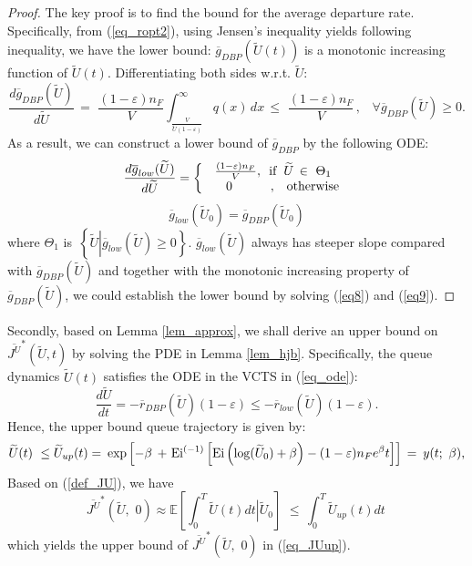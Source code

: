 \documentclass[11pt,journal, onecolumn]{./IEEEtran}
\newcommand{\red}{\color{black}}
\begin{document}
\begin{proof} {\red The key proof is to find the bound for the average departure rate. Specifically,
from (\ref{eq_ropt2}), using Jensen's inequality yields following inequality, we have the lower bound:}
$\overline g _{DBP}(\widetilde U(t))$ is a monotonic increasing function of $\widetilde U(t)$. Differentiating both sides w.r.t. $\widetilde U$:
\[\frac{{d{{\overline g }_{DBP}}(\widetilde U)}}{{d\widetilde U}}\, = \,\,\frac{(1 - {\varepsilon}){n_F}}{V}\int_{\frac{V}{{{\widetilde U}(1 - {\varepsilon})}}}^\infty  {q(x)} \,dx\, \le \,\,\frac{(1 - {\varepsilon}){n_F}}{V}\,,\,\,\,\,\,\forall {\overline g _{DBP}}(\widetilde U) \ge 0.\]
As a result, we can construct a lower bound of $\overline g_{DBP}$ by the following ODE:
\begin{equation}\label{eq8}\frac{{d{{\overline g }_{low}}(\widetilde U)}}{{d\widetilde U}} = \left\{ {\begin{array}{*{20}{c}}
   {\frac{ (1 - {\varepsilon}){n_F}}{V},\,\,\,{\rm{if}}\,\,\,\widetilde U\, \in \,\,{\Theta _1}\,}  \\
   {\,\,\,\,\,\,\,\,0\,\,\,\,\,\,\,\,\,\,\,\,\,\,\,\,\,\,,\,\,\,\,\,{\rm{otherwise}}}  \\
\end{array}\,} \right.
\end{equation}
\begin{equation}\label{eq9}{\overline g_{low}}({\widetilde U_0}) = {\overline g_{DBP}}({\widetilde U_0})\end{equation}
where $\Theta_1$ is $\,\left\{ {\widetilde U\left| {{{\overline g _{low}}}(\widetilde U) \ge 0} \right.} \right\}$. ${\overline g _{low}}(\widetilde U)$ always has steeper slope compared with $\overline g_{DBP}(\widetilde U)$ and together with the monotonic increasing property of $\overline g _{DBP}(\widetilde U)$, we could establish the lower bound by solving (\ref{eq8}) and (\ref{eq9}).
\end{proof}


{\red Secondly, based on Lemma \ref{lem_approx}, we shall derive an upper bound on $\overline {J^U}^*(\widetilde U,t)$ by solving the PDE in Lemma \ref{lem_hjb}.} Specifically, the queue dynamics $\widetilde U(t)$ satisfies the ODE in the VCTS in (\ref{eq_ode}):
\begin{equation}\label{eq_odeapx}
\frac{d\widetilde U}{dt} = -\overline{r}_{DBP}(\widetilde U)(1-\varepsilon) \leq -\overline{r}_{low}(\widetilde U)(1-\varepsilon).
\end{equation}
Hence, the upper bound queue trajectory is given by:
\begin{equation}\label{eq_uup}
\widetilde U(t)\,\, \le {\widetilde U_{up}}(t) = {\mkern 1mu} \exp \left[ { - \beta {\kern 1pt} {\kern 1pt}  + {\kern 1pt} {\rm{E}}{{\rm{i}}^{( - 1)}}\left[ {{\rm{Ei}}\left( {\log ({{\widetilde U}_0}) + \beta } \right) - (1 - {\varepsilon}){n_F}{e^{\beta}}t} \right]} \right]\, = \,{\mkern 1mu} y(t;\,\,\beta ),
\end{equation}
Based on (\ref{def_JU}), we have
\[{\overline {{J^U}} ^*}(\widetilde U,\,\,0) \approx \mathbb E\left[ {\int_0^T {\widetilde U(t)dt} \left| {{{\widetilde U}_0}} \right.} \right]\,\, \le \,\int_0^T {{{\widetilde U}_{up}}} (t)dt\,\]
which yields the upper bound of ${\overline {{J^U}} ^*}(\widetilde U,\,\,0)$ in (\ref{eq_JUup}).
\end{document}
